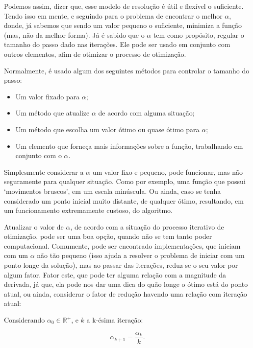 Podemos assim, dizer que, esse modelo de resolução é útil e flexível o
suficiente. Tendo isso em mente, e seguindo para o problema de encontrar
o melhor \(\alpha\), donde, já sabemos que sendo um valor pequeno o
suficiente, minimiza a função (mas, não da melhor forma). Já é sabido
que o \(\alpha\) tem como propósito, regular o tamanho do passo dado nas
iterações. Ele pode ser usado em conjunto com outros elementos, afim de
otimizar o processo de otimização.

Normalmente, é usado algum dos seguintes métodos para controlar o tamanho do
passo:

    \begin{itemize}
            \item Um valor fixado para \(\alpha\);
            \item Um método que atualize \(\alpha\) de acordo com alguma
                situação;
            \item Um método que escolha um valor ótimo ou quase ótimo para
                \(\alpha\);
            \item Um elemento que forneça mais informações sobre a função,
                trabalhando em conjunto com o \(\alpha\).
    \end{itemize}


Simplesmente considerar a \(\alpha\) um valor fixo e pequeno, pode funcionar,
mas não seguramente para qualquer situação. Como por exemplo, uma função que
possui `movimentos bruscos', em um escala minúscula. Ou ainda, caso se tenha
considerado um ponto inicial muito distante, de qualquer ótimo, resultando,
em um funcionamento extremamente custoso, do algoritmo.

Atualizar o valor de \(\alpha\), de acordo com a situação do processo iterativo
de otimização, pode ser uma boa opção, quando não se tem tanto poder
computacional. Comumente, pode ser encontrado implementações, que iniciam
com um \(\alpha\) não tão pequeno (isso ajuda a resolver o problema de
iniciar com um ponto longe da solução), mas ao passar das iterações,
reduz-se o seu valor por algum fator. Fator este, que pode ter alguma relação
com a magnitude da derivada, já que, ela pode nos dar uma dica do quão longe
o ótimo está do ponto atual, ou ainda, considerar o fator de redução havendo
uma relação com iteração atual:


Considerando \(\alpha_{0} \in \mathbb{R}^{+}  \), e \(k\) a k-ésima iteração:

\begin{equation}
    \alpha_{k+1} = \frac{\alpha_{k}}{k}.
\end{equation}


